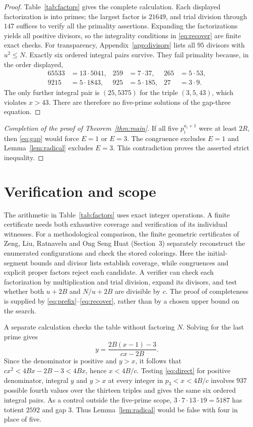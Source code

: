 \documentclass[11pt]{article}
\begin{document}
\begin{proof}
Table~\ref{tab:factors} gives the complete calculation. Each displayed
factorization is into primes; the largest factor is $21649$, and trial
division through $147$ suffices to verify all the primality assertions.
Expanding the factorizations yields all positive divisors, so the
integrality conditions in \eqref{eq:recover} are finite exact checks.
For transparency, Appendix~\ref{app:divisors} lists all $95$ divisors
with $u^2\le N$. Exactly six ordered integral pairs survive. They fail
primality because, in the order displayed,
\begin{align*}
 65533&=13\cdot5041, &259&=7\cdot37, &265&=5\cdot53,\\
 9215&=5\cdot1843, &925&=5\cdot185, &27&=3\cdot9.
\end{align*}
The only further integral pair is $(25,5375)$ for the triple
$(3,5,43)$, which violates $x>43$. There are therefore no five-prime
solutions of the gap-three equation.
\end{proof}

\begin{proof}[Completion of the proof of Theorem~\ref{thm:main}]
If all five $p_i^{a_i+1}$ were at least $2R$, then
\eqref{eq:gap} would force $E=1$ or $E=3$. The congruence excludes
$E=1$ and Lemma~\ref{lem:radical} excludes $E=3$.
This contradiction proves the asserted strict inequality.
\end{proof}

\section{Verification and scope}

The arithmetic in Table~\ref{tab:factors} uses exact integer operations.
A finite certificate needs both exhaustive coverage and verification of
its individual witnesses. For a methodological comparison, the finite
geometric certificates of Zeng, Liu, Ratnavelu and Ong Seng Huat
\cite{ZengEtAl2026} (Section~3) separately reconstruct the enumerated
configurations and check the stored colorings. Here the initial-segment
bounds and divisor lists establish coverage, while congruences and
explicit proper factors reject each candidate.
A verifier can check each factorization by multiplication and trial
division, expand its divisors, and test whether both $u+2B$ and
$N/u+2B$ are divisible by $c$. The proof of completeness is supplied
by \eqref{eq:prefix}--\eqref{eq:recover}, rather than by a chosen
upper bound on the search.

A separate calculation checks the table without factoring $N$.
Solving for the last prime gives
\begin{equation}\label{eq:direct}
 y=\frac{2B(x-1)-3}{cx-2B}.
\end{equation}
Since the denominator is positive and $y>x$, it follows that
$cx^2<4Bx-2B-3<4Bx$, hence $x<4B/c$.
Testing \eqref{eq:direct} for positive denominator, integral $y$ and
$y>x$ at every integer in $p_3<x<4B/c$ involves $937$ possible
fourth values over the thirteen triples and gives the same six
ordered integral pairs. As a control outside the five-prime scope,
$3\cdot7\cdot13\cdot19=5187$ has totient $2592$ and gap $3$.
Thus Lemma~\ref{lem:radical} would be false with four in place of five.
\end{document}
